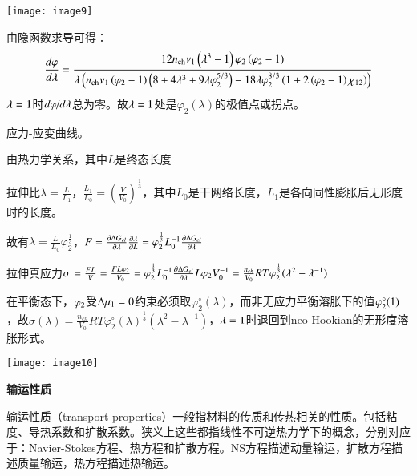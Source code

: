 \documentclass{article} %
\begin{document}
\noindent \texttt{[image: image9]}

\noindent 由隐函数求导可得：
\[\frac{d\varphi }{d\lambda } =\frac{12n_{{\rm ch}} \nu _{1} \left(\lambda ^{3} -1\right)\varphi _{2} \left(\varphi _{2} -1\right)}{\lambda \left(n_{{\rm ch}} \nu _{{\rm 1}} \left(\varphi _{2} -1\right)\left(8+4\lambda ^{3} +9\lambda \varphi _{2}^{{\rm 5}/3} \right)-18\lambda \varphi _{2}^{8/3} \left(1+2\left(\varphi _{2} -1\right)\chi _{{\rm 1}2} \right)\right)} \] 
$\lambda ={\rm 1}$时${d\varphi \mathord{\left/ {\vphantom {d\varphi  d\lambda }} \right. \kern-\nulldelimiterspace} d\lambda } $总为零。故$\lambda ={\rm 1}$处是$\varphi _{2}^{} (\lambda )$的极值点或拐点。

\noindent 应力-应变曲线。

\noindent 由热力学关系，其中$L$是终态长度

\noindent 拉伸比$\lambda =\frac{L}{L_{1} } $，$\frac{L_{1} }{L_{0} } =(\frac{V}{V_{0} } )^{\frac{1}{3} } $，其中$L_{0} $是干网络长度，$L_{1} $是各向同性膨胀后无形度时的长度。

\noindent 故有$\lambda =\frac{L}{L_{0} } \varphi _{2}^{\frac{1}{3} } $，$F=\frac{\partial {\rm \Delta }G_{el} }{\partial \lambda } \frac{\partial \lambda }{\partial L} =\varphi _{2}^{\frac{1}{3} } L_{0}^{-{\rm 1}} \frac{\partial {\rm \Delta }G_{el} }{\partial \lambda } $

\noindent 拉伸真应力$\sigma =\frac{FL}{V} =\frac{FL\varphi _{2} }{V_{0} } =\varphi _{2}^{\frac{1}{3} } L_{0}^{-1} \frac{\partial {\rm \Delta }G_{el} }{\partial \lambda } L\varphi _{2} V_{0}^{-1} =\frac{n_{ch} }{V_{0} } RT\varphi _{2}^{\frac{1}{3} } (\lambda ^{2} -\lambda ^{-1} )$

\noindent 在平衡态下，$\varphi _{{\rm 2}} $受${\rm \Delta }\mu _{1} =0$约束必须取$\varphi _{2}^{\circ } (\lambda )$，而非无应力平衡溶胀下的值$\varphi _{2}^{\circ } ({\rm 1})$，故$\sigma (\lambda )=\frac{n_{ch} }{V_{0} } RT\varphi _{2}^{\circ } (\lambda )^{\frac{1}{3} } (\lambda ^{2} -\lambda ^{-1} )$，$\lambda ={\rm 1}$时退回到neo-Hookian的无形度溶胀形式。

\noindent \texttt{[image: image10]}

\noindent \eject 

\noindent \textbf{输运性质}

输运性质（transport properties）一般指材料的传质和传热相关的性质。包括粘度、导热系数和扩散系数。狭义上这些都指线性不可逆热力学下的概念，分别对应于：Navier-Stokes方程、热方程和扩散方程。NS方程描述动量输运，扩散方程描述质量输运，热方程描述热输运。
\end{document}

